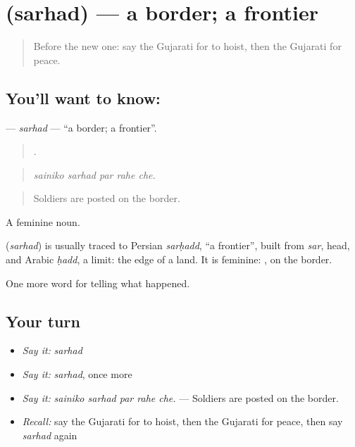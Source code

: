 \section[\texorpdfstring{\gu{સરહદ} (sarhad)}{સરહદ (sarhad)}]{ (sarhad) — a border; a frontier}

\label{lesson:GU-C326-sarhad}



\begin{quote}
Before the new one: say the Gujarati for to hoist, then the Gujarati for peace.
\end{quote}

\subsection*{You'll want to know: }
\textbf{} — \emph{sarhad} — \textquotedblleft{}a border; a frontier\textquotedblright{}.

\begin{quote}
    .
\end{quote}

\begin{quote}
\emph{sainiko sarhad par rahe che.}
\end{quote}

\begin{quote}
Soldiers are posted on the border.
\end{quote}

A feminine noun.

\begin{cousinweb}
\textbf{} (\emph{sarhad}) is usually traced to Persian \emph{sarḥadd}, \textquotedblleft{}a frontier\textquotedblright{}, built from \emph{sar}, head, and Arabic \emph{ḥadd}, a limit: the edge of a land. It is feminine: \textbf{ }, on the border.
\end{cousinweb}

\begin{grammarlens}[title={What you've built}]
One more word for telling what happened.
\end{grammarlens}

\subsection*{Your turn}
\begin{itemize}
\raggedright
  \item \emph{Say it:} \emph{sarhad}
  \item \emph{Say it:} \emph{sarhad}, once more
  \item \emph{Say it:} \emph{sainiko sarhad par rahe che.} — Soldiers are posted on the border.
  \item \emph{Recall:} say the Gujarati for to hoist, then the Gujarati for peace, then say \emph{sarhad} again
\end{itemize}

